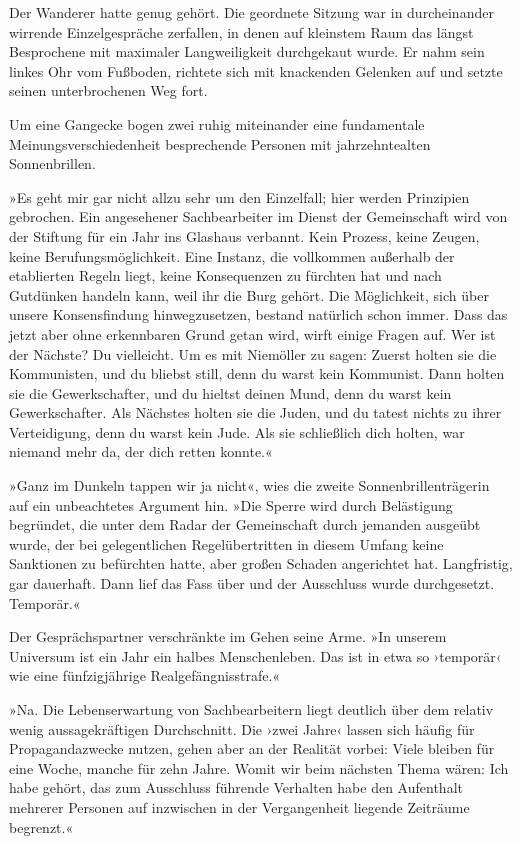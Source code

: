 Der Wanderer hatte genug gehört. Die geordnete Sitzung war in durcheinander wirrende Einzelgespräche zerfallen, in denen auf kleinstem Raum das längst Besprochene mit maximaler Langweiligkeit durchgekaut wurde. Er nahm sein linkes Ohr vom Fußboden, richtete sich mit knackenden Gelenken auf und setzte seinen unterbrochenen Weg fort.

Um eine Gangecke bogen zwei ruhig miteinander eine fundamentale Meinungsverschiedenheit besprechende Personen mit jahrzehntealten Sonnenbrillen.

»Es geht mir gar nicht allzu sehr um den Einzelfall; hier werden Prinzipien gebrochen. Ein angesehener Sachbearbeiter im Dienst der Gemeinschaft wird von der Stiftung für ein Jahr ins Glashaus verbannt. Kein Prozess, keine Zeugen, keine Berufungsmöglichkeit. Eine Instanz, die vollkommen außerhalb der etablierten Regeln liegt, keine Konsequenzen zu fürchten hat und nach Gutdünken handeln kann, weil ihr die Burg gehört. Die Möglichkeit, sich über unsere Konsensfindung hinwegzusetzen, bestand natürlich schon immer. Dass das jetzt aber ohne erkennbaren Grund getan wird, wirft einige Fragen auf. Wer ist der Nächste? Du vielleicht. Um es mit Niemöller zu sagen: Zuerst holten sie die Kommunisten, und du bliebst still, denn du warst kein Kommunist. Dann holten sie die Gewerkschafter, und du hieltst deinen Mund, denn du warst kein Gewerkschafter. Als Nächstes holten sie die Juden, und du tatest nichts zu ihrer Verteidigung, denn du warst kein Jude. Als sie schließlich dich holten, war niemand mehr da, der dich retten konnte.«

»Ganz im Dunkeln tappen wir ja nicht«, wies die zweite Sonnenbrillenträgerin auf ein unbeachtetes Argument hin. »Die Sperre wird durch Belästigung begründet, die unter dem Radar der Gemeinschaft durch jemanden ausgeübt wurde, der bei gelegentlichen Regelübertritten in diesem Umfang keine Sanktionen zu befürchten hatte, aber großen Schaden angerichtet hat. Langfristig, gar dauerhaft. Dann lief das Fass über und der Ausschluss wurde durchgesetzt. Temporär.«

Der Gesprächspartner verschränkte im Gehen seine Arme. »In unserem Universum ist ein Jahr ein halbes Menschenleben. Das ist in etwa so ›temporär‹ wie eine fünfzigjährige Realgefängnisstrafe.«

»Na. Die Lebenserwartung von Sachbearbeitern liegt deutlich über dem relativ wenig aussagekräftigen Durchschnitt. Die ›zwei Jahre‹ lassen sich häufig für Propagandazwecke nutzen, gehen aber an der Realität vorbei: Viele bleiben für eine Woche, manche für zehn Jahre. Womit wir beim nächsten Thema wären: Ich habe gehört, das zum Ausschluss führende Verhalten habe den Aufenthalt mehrerer Personen auf inzwischen in der Vergangenheit liegende Zeiträume begrenzt.«

